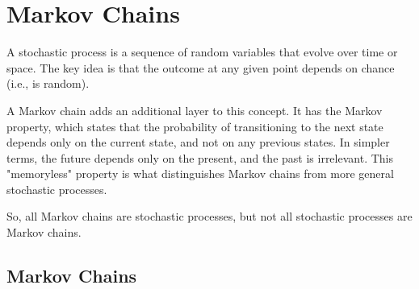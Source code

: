 \section{Markov Chains}

A stochastic process is a sequence of random variables that evolve over time or space. The key idea is that the outcome at any given point depends on chance (i.e., is random).

A Markov chain adds an additional layer to this concept. It has the Markov property, which states that the probability of transitioning to the next state depends only on the current state, and not on any previous states. In simpler terms, the future depends only on the present, and the past is irrelevant. This "memoryless" property is what distinguishes Markov chains from more general stochastic processes.

So, all Markov chains are stochastic processes, but not all stochastic processes are Markov chains.

\subsection{Markov Chains}

